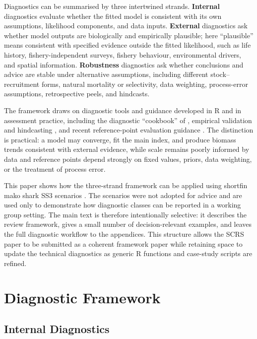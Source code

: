 \documentclass[11pt,a4paper]{article}
\begin{document}
Diagnostics can be summarised by three intertwined strands. \textbf{Internal} diagnostics evaluate whether the fitted model is consistent with its own assumptions, likelihood components, and data inputs. \textbf{External} diagnostics ask whether model outputs are biologically and empirically plausible; here ``plausible'' means consistent with specified evidence outside the fitted likelihood, such as life history, fishery-independent surveys, fishery behaviour, environmental drivers, and spatial information. \textbf{Robustness} diagnostics ask whether conclusions and advice are stable under alternative assumptions, including different stock--recruitment forms, natural mortality or selectivity, data weighting, process-error assumptions, retrospective peels, and hindcasts.

The framework draws on diagnostic tools and guidance developed in R and in assessment practice, including the diagnostic ``cookbook'' of \citet{carvalho2021cookbook}, empirical validation and hindcasting \citep{kell2016evaluation,kell2024empirical}, and recent reference-point evaluation guidance \citep{ICES2024}. The distinction is practical: a model may converge, fit the main index, and produce biomass trends consistent with external evidence, while scale remains poorly informed by data and reference points depend strongly on fixed values, priors, data weighting, or the treatment of process error.

This paper shows how the three-strand framework can be applied using shortfin mako shark SS3 scenarios \citep{ICCAT2025SMA}. The scenarios were not adopted for advice and are used only to demonstrate how diagnostic classes can be reported in a working group setting. The main text is therefore intentionally selective: it describes the review framework, gives a small number of decision-relevant examples, and leaves the full diagnostic workflow to the appendices. This structure allows the SCRS paper to be submitted as a coherent framework paper while retaining space to update the technical diagnostics as generic R functions and case-study scripts are refined.

\section{Diagnostic Framework}

\subsection{Internal Diagnostics}
\end{document}
